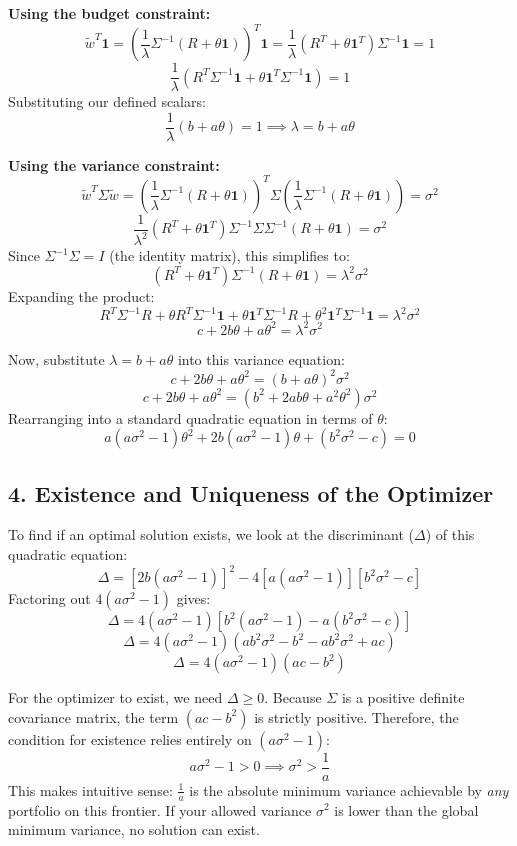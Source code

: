 \vspace{0.5em}
\noindent \textbf{Using the budget constraint:}
$$\tilde{w}^T \mathbf{1} = \left( \frac{1}{\lambda} \Sigma^{-1} (R + \theta \mathbf{1}) \right)^T \mathbf{1} = \frac{1}{\lambda} (R^T + \theta \mathbf{1}^T) \Sigma^{-1} \mathbf{1} = 1$$
$$\frac{1}{\lambda} (R^T \Sigma^{-1} \mathbf{1} + \theta \mathbf{1}^T \Sigma^{-1} \mathbf{1}) = 1$$
Substituting our defined scalars:
$$\frac{1}{\lambda} (b + a\theta) = 1 \implies \lambda = b + a\theta$$

\vspace{0.5em}
\noindent \textbf{Using the variance constraint:}
$$\tilde{w}^T \Sigma \tilde{w} = \left( \frac{1}{\lambda} \Sigma^{-1} (R + \theta \mathbf{1}) \right)^T \Sigma \left( \frac{1}{\lambda} \Sigma^{-1} (R + \theta \mathbf{1}) \right) = \sigma^2$$
$$\frac{1}{\lambda^2} (R^T + \theta \mathbf{1}^T) \Sigma^{-1} \Sigma \Sigma^{-1} (R + \theta \mathbf{1}) = \sigma^2$$
Since $\Sigma^{-1} \Sigma = I$ (the identity matrix), this simplifies to:
$$(R^T + \theta \mathbf{1}^T) \Sigma^{-1} (R + \theta \mathbf{1}) = \lambda^2 \sigma^2$$
Expanding the product:
$$R^T \Sigma^{-1} R + \theta R^T \Sigma^{-1} \mathbf{1} + \theta \mathbf{1}^T \Sigma^{-1} R + \theta^2 \mathbf{1}^T \Sigma^{-1} \mathbf{1} = \lambda^2 \sigma^2$$
$$c + 2b\theta + a\theta^2 = \lambda^2 \sigma^2$$

Now, substitute $\lambda = b + a\theta$ into this variance equation:
$$c + 2b\theta + a\theta^2 = (b + a\theta)^2 \sigma^2$$
$$c + 2b\theta + a\theta^2 = (b^2 + 2ab\theta + a^2\theta^2) \sigma^2$$
Rearranging into a standard quadratic equation in terms of $\theta$:
$$a(a\sigma^2 - 1)\theta^2 + 2b(a\sigma^2 - 1)\theta + (b^2\sigma^2 - c) = 0$$

\subsection*{4. Existence and Uniqueness of the Optimizer}
To find if an optimal solution exists, we look at the discriminant ($\Delta$) of this quadratic equation:
$$\Delta = [2b(a\sigma^2 - 1)]^2 - 4[a(a\sigma^2 - 1)][b^2\sigma^2 - c]$$
Factoring out $4(a\sigma^2 - 1)$ gives:
$$\Delta = 4(a\sigma^2 - 1) \left[ b^2(a\sigma^2 - 1) - a(b^2\sigma^2 - c) \right]$$
$$\Delta = 4(a\sigma^2 - 1) (ab^2\sigma^2 - b^2 - ab^2\sigma^2 + ac)$$
$$\Delta = 4(a\sigma^2 - 1)(ac - b^2)$$

For the optimizer to exist, we need $\Delta \ge 0$. Because $\Sigma$ is a positive definite covariance matrix, the term $(ac - b^2)$ is strictly positive. Therefore, the condition for existence relies entirely on $(a\sigma^2 - 1)$:
$$a\sigma^2 - 1 > 0 \implies \sigma^2 > \frac{1}{a}$$
This makes intuitive sense: $\frac{1}{a}$ is the absolute minimum variance achievable by \textit{any} portfolio on this frontier. If your allowed variance $\sigma^2$ is lower than the global minimum variance, no solution can exist.

